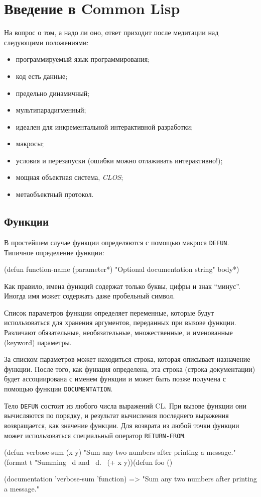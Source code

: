 \chapter{Введение в Common Lisp}
\label{ch:cl}
На вопрос о том, а надо ли оно, ответ приходит после медитации над следующими положениями:
\begin{itemize}
  \item программируемый язык программирования;
  \item код есть данные;
  \item предельно динамичный;
  \item мультипарадигменный;
  \item идеален для инкрементальной интерактивной разработки;
  \item макросы;
  \item условия и перезапуски (ошибки можно отлаживать интерактивно!);
  \item мощная объектная система, \emph{CLOS};
  \item метаобъектный протокол.
\end{itemize}

\section{Функции}
В простейшем случае функции определяются с помощью макроса \lstinline{DEFUN}. Типичное определение функции:

\begin{cllst}{}{}
(defun function-name (parameter*)
  "Optional documentation string"
  body*)
\end{cllst}

Как правило, имена функций содержат только буквы, цифры и знак ``минус''. Иногда имя может содержать даже пробельный символ.

Список параметров функции определяет переменные, которые будут использоваться для хранения аргументов, переданных при вызове функции. Различают обязательные, необязательные, множественные, и именованные (keyword) параметры.

За списком параметров может находиться строка, которая описывает назначение функции. После того, как функция определена, эта строка (строка документации) будет ассоциирована с именем функции и может быть позже получена с помощью функции \lstinline{DOCUMENTATION}.

Тело \lstinline{DEFUN} состоит из любого числа выражений CL. При вызове функции они вычисляются по порядку, и результат вычисления последнего выражения возвращается, как значение функции. Для возврата из любой точки функции может использоваться специальный оператор \lstinline{RETURN-FROM}.
\begin{cllst}{}{}
(defun verbose-sum (x y)
  "Sum any two numbers after printing a message."
  (format t "Summing ~d and ~d.~%
  (+ x y))(defun foo ()

(documentation 'verbose-sum 'function) => "Sum any two numbers after printing a message."
\end{cllst}

